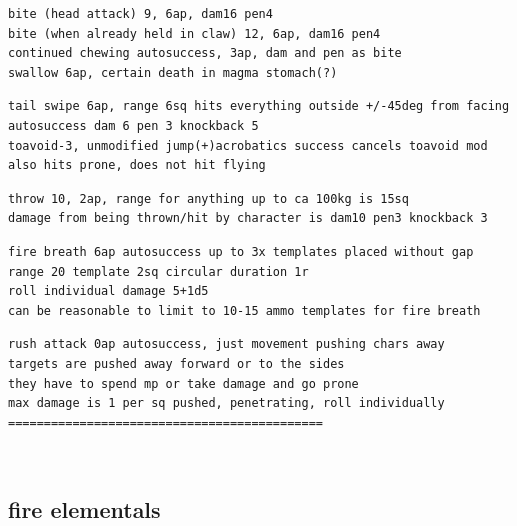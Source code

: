 \begin{samepage}
\begin{verbatim}
\end{verbatim} \end{samepage} \goodbreak \begin{samepage} \begin{verbatim}
bite (head attack) 9, 6ap, dam16 pen4 
bite (when already held in claw) 12, 6ap, dam16 pen4
continued chewing autosuccess, 3ap, dam and pen as bite
swallow 6ap, certain death in magma stomach(?)

\end{verbatim} \end{samepage} \goodbreak \begin{samepage} \begin{verbatim}
tail swipe 6ap, range 6sq hits everything outside +/-45deg from facing
autosuccess dam 6 pen 3 knockback 5
toavoid-3, unmodified jump(+)acrobatics success cancels toavoid mod
also hits prone, does not hit flying

\end{verbatim} \end{samepage} \goodbreak \begin{samepage} \begin{verbatim}
throw 10, 2ap, range for anything up to ca 100kg is 15sq
damage from being thrown/hit by character is dam10 pen3 knockback 3

\end{verbatim} \end{samepage} \goodbreak \begin{samepage} \begin{verbatim}
fire breath 6ap autosuccess up to 3x templates placed without gap
range 20 template 2sq circular duration 1r
roll individual damage 5+1d5
can be reasonable to limit to 10-15 ammo templates for fire breath

\end{verbatim} \end{samepage} \goodbreak \begin{samepage} \begin{verbatim}
rush attack 0ap autosuccess, just movement pushing chars away
targets are pushed away forward or to the sides
they have to spend mp or take damage and go prone
max damage is 1 per sq pushed, penetrating, roll individually
============================================
\end{verbatim} \end{samepage} \normalsize

\


\goodbreak 
\subsection*{fire elementals}

